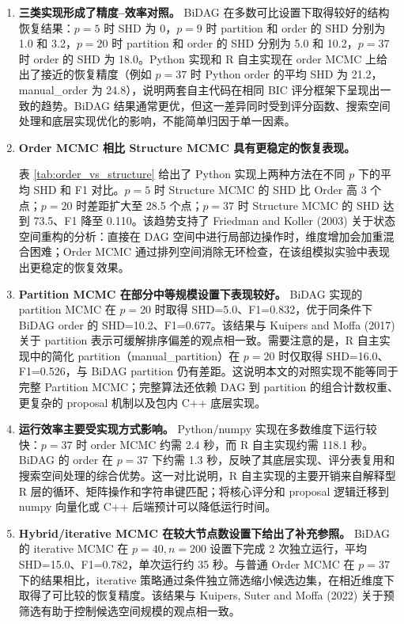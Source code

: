 \documentclass[UTF8,a4paper,12pt]{ctexart}
\begin{document}
\begin{enumerate}
  \item \textbf{三类实现形成了精度--效率对照。} BiDAG 在多数可比设置下取得较好的结构恢复结果：$p=5$ 时 SHD 为 0，$p=9$ 时 partition 和 order 的 SHD 分别为 1.0 和 3.2，$p=20$ 时 partition 和 order 的 SHD 分别为 5.0 和 10.2，$p=37$ 时 order 的 SHD 为 18.0。Python 实现和 R 自主实现在 order MCMC 上给出了接近的恢复精度（例如 $p=37$ 时 Python order 的平均 SHD 为 21.2，manual\_order 为 24.8），说明两套自主代码在相同 BIC 评分框架下呈现出一致的趋势。BiDAG 结果通常更优，但这一差异同时受到评分函数、搜索空间处理和底层实现优化的影响，不能简单归因于单一因素。

  \item \textbf{Order MCMC 相比 Structure MCMC 具有更稳定的恢复表现。}
  
  表 \ref{tab:order_vs_structure} 给出了 Python 实现上两种方法在不同 $p$ 下的平均 SHD 和 F1 对比。$p=5$ 时 Structure MCMC 的 SHD 比 Order 高 3 个点；$p=20$ 时差距扩大至 28.5 个点；$p=37$ 时 Structure MCMC 的 SHD 达到 73.5、F1 降至 0.110。该趋势支持了 Friedman and Koller (2003) 关于状态空间重构的分析：直接在 DAG 空间中进行局部边操作时，维度增加会加重混合困难；Order MCMC 通过排列空间消除无环检查，在该组模拟实验中表现出更稳定的恢复效果。

  \item \textbf{Partition MCMC 在部分中等规模设置下表现较好。} BiDAG 实现的 partition MCMC 在 $p=20$ 时取得 SHD=5.0、F1=0.832，优于同条件下 BiDAG order 的 SHD=10.2、F1=0.677。该结果与 Kuipers and Moffa (2017) 关于 partition 表示可缓解排序偏差的观点相一致。需要注意的是，R 自主实现中的简化 partition（manual\_partition）在 $p=20$ 时仅取得 SHD=16.0、F1=0.526，与 BiDAG partition 仍有差距。这说明本文的对照实现不能等同于完整 Partition MCMC；完整算法还依赖 DAG 到 partition 的组合计数权重、更复杂的 proposal 机制以及包内 C++ 底层实现。

  \item \textbf{运行效率主要受实现方式影响。} Python/numpy 实现在多数维度下运行较快：$p=37$ 时 order MCMC 约需 2.4 秒，而 R 自主实现约需 118.1 秒。BiDAG 的 order 在 $p=37$ 下约需 1.3 秒，反映了其底层实现、评分表复用和搜索空间处理的综合优势。这一对比说明，R 自主实现的主要开销来自解释型 R 层的循环、矩阵操作和字符串键匹配；将核心评分和 proposal 逻辑迁移到 numpy 向量化或 C++ 后端预计可以降低运行时间。

  \item \textbf{Hybrid/iterative MCMC 在较大节点数设置下给出了补充参照。} BiDAG 的 iterative MCMC 在 $p=40, n=200$ 设置下完成 2 次独立运行，平均 SHD=15.0、F1=0.782，单次运行约 35 秒。与普通 Order MCMC 在 $p=37$ 下的结果相比，iterative 策略通过条件独立筛选缩小候选边集，在相近维度下取得了可比较的恢复精度。该结果与 Kuipers, Suter and Moffa (2022) 关于预筛选有助于控制候选空间规模的观点相一致。
\end{enumerate}
\end{document}
